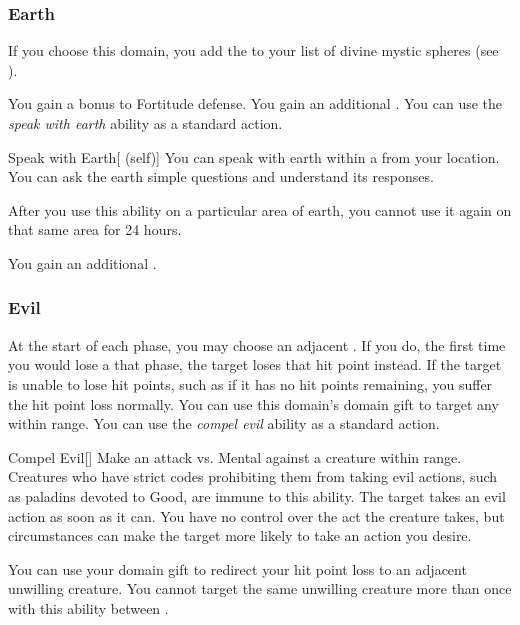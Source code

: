         \subsubsection{Earth}
            If you choose this domain, you add the   to your list of divine mystic spheres (see ).

             You gain a  bonus to Fortitude defense.
             You gain an additional .
             You can use the \textit{speak with earth} ability as a standard action.
            \begin{attuneability}{Speak with Earth}[ (self)]
                You can speak with earth within a \areahuge {} from your location.
                You can ask the earth simple questions and understand its responses.

                After you use this ability on a particular area of earth, you cannot use it again on that same area for 24 hours.
            \end{attuneability}
             You gain an additional .

        \subsubsection{Evil}
             At the start of each phase, you may choose an adjacent .
            If you do, the first time you would lose a  that phase, the target loses that hit point instead.
            If the target is unable to lose hit points, such as if it has no hit points remaining, you suffer the hit point loss normally.
             You can use this domain's domain gift to target any  within \rngclose range.
             You can use the \textit{compel evil} ability as a standard action.
            \begin{freeability}{Compel Evil}[]
                Make an attack vs. Mental against a creature within \rngmed range.
                Creatures who have strict codes prohibiting them from taking evil actions, such as paladins devoted to Good, are immune to this ability.
                \hit The target takes an evil action as soon as it can.
                You have no control over the act the creature takes, but circumstances can make the target more likely to take an action you desire.
            \end{freeability}
             You can use your domain gift to redirect your hit point loss to an adjacent unwilling creature.
            You cannot target the same unwilling creature more than once with this ability between .

